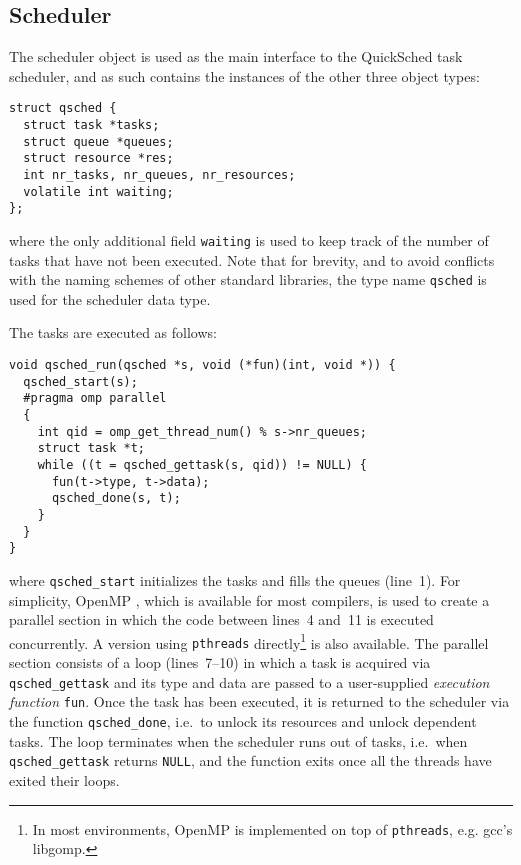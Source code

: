 \documentclass[preprint]{elsarticle}
\begin{document}
\subsection{Scheduler}

The scheduler object is used as the main interface to the
QuickSched task scheduler, and as such contains the instances
of the other three object types:
\begin{center}\begin{minipage}{0.9\textwidth}
    \begin{lstlisting}
struct qsched {
  struct task *tasks;
  struct queue *queues;
  struct resource *res;
  int nr_tasks, nr_queues, nr_resources;
  volatile int waiting;
};
    \end{lstlisting}
\end{minipage}\end{center}
\noindent where the only additional field {\tt waiting} is
used to keep track of the number of tasks that have not been
executed.
Note that for brevity, and to avoid conflicts with the naming
schemes of other standard libraries, the type name {\tt qsched}
is used for the scheduler data type.

The tasks are executed as follows:
\begin{center}\begin{minipage}{0.9\textwidth}
    \begin{lstlisting}
void qsched_run(qsched *s, void (*fun)(int, void *)) {
  qsched_start(s);
  #pragma omp parallel
  {
    int qid = omp_get_thread_num() % s->nr_queues;
    struct task *t;
    while ((t = qsched_gettask(s, qid)) != NULL) {
      fun(t->type, t->data);
      qsched_done(s, t);
    }
  }
}
    \end{lstlisting}
\end{minipage}\end{center}
\noindent where {\tt qsched\_start} initializes the tasks and
fills the queues (line~1).
For simplicity, OpenMP \cite{ref:Dagum1998}, which is available
for most compilers, is used to create a parallel section
in which the code between lines~4 and~11 is executed
concurrently.
A version using {\tt pthreads} \cite{ref:Pthreads1995}
directly\footnote{In most environments, OpenMP is implemented
on top of {\tt pthreads}, e.g. gcc's libgomp.} is also available.
The parallel section consists of a loop (lines~7--10) in
which a task is acquired via {\tt qsched\_gettask}
and its type and data are passed to a user-supplied
{\em execution function} {\tt fun}.
Once the task has been executed, it is returned to the
scheduler via the function {\tt qsched\_done}, i.e.~to
unlock its resources and unlock dependent tasks.
The loop terminates when the scheduler runs out of tasks,
i.e.~when {\tt qsched\_gettask} returns {\tt NULL}, and
the function exits once all the threads have exited their
loops.
\end{document}
